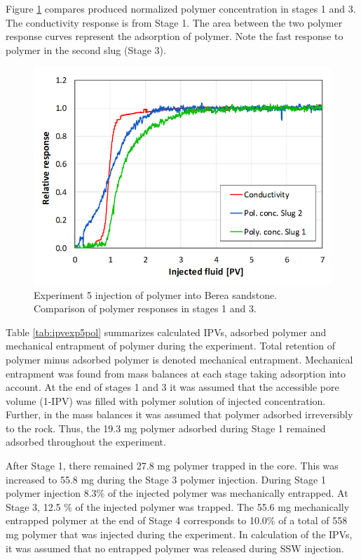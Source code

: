 Figure \ref{cht:injexp5ber2} compares produced normalized polymer concentration in stages 1 and 3. The conductivity response is from Stage 1. The area between the two polymer response curves represent the adsorption of polymer. Note the fast response to polymer in the second slug (Stage 3).
 
\begin{figure}[h!]
    \centering
    \includegraphics[width=\textwidth]{img/cht/injexp5ber2.png}
    \caption{Experiment 5 injection of polymer into Berea sandstone. Comparison of polymer responses in stages 1 and 3.}
    \label{cht:injexp5ber2}
\end{figure}

Table \ref{tab:ipvexp5pol} summarizes calculated IPVs, adsorbed polymer and mechanical entrapment of polymer during the experiment. Total retention of polymer minus adsorbed polymer is denoted mechanical entrapment. Mechanical entrapment was found from mass balances at each stage taking adsorption into account. At the end of stages 1 and 3 it was assumed that the accessible pore volume (1-IPV) was filled with polymer solution of injected concentration. Further, in the mass balances it was assumed that polymer adsorbed irreversibly to the rock. Thus, the 19.3 mg polymer adsorbed during Stage 1 remained adsorbed throughout the experiment.

After Stage 1, there remained 27.8 mg polymer trapped in the core. This was increased to 55.8 mg during the Stage 3 polymer injection. During Stage 1 polymer injection 8.3\% of the injected polymer was mechanically entrapped. At Stage 3, 12.5 \% of the injected polymer was trapped. The 55.6 mg mechanically entrapped polymer at the end of Stage 4 corresponds to 10.0\% of a total of 558 mg polymer that was injected during the experiment. In calculation of the IPVs, it was assumed that no entrapped polymer was released during SSW injection.

